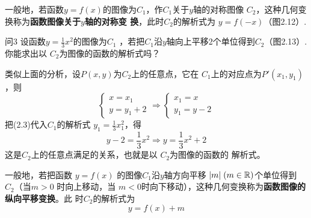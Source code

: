 一般地，若函数$y=f(x)$的图像为$C_1$，作$C_1$关于$y$轴的对称图像
$C_2$，这种几何变换称为\textbf{函数图像关于$y$轴的对称变
换}，此时$C_2$的解析式为
$y=f(-x)$（图2.12）.

\begin{thm}{问3}
设函数$y=\frac{1}{3}x^2$的图像为$C_1$
，若把$C_1$沿$y$轴向上平移2个单位得到$C_2$（图2.13）. 你能求出以
$C_2$为图像的函数的解析式吗？
\end{thm}

类似上面的分析，设$P(x,y)$为$C_2$上的任意点，它在
$C_1$上的对应点为$P'(x_1,y_1)$，则
\begin{equation}
    \begin{cases}
        x=x_1\\y=y_1+2
    \end{cases}\Longrightarrow \begin{cases}
        x_1=x\\y_1=y-2
    \end{cases}
\end{equation}
把(2.3)代入$C_1$的解析式
$y_1=\frac{1}{3}x_1^2$，得
\[y-2=\frac{1}{3}x^2\Longrightarrow y=\frac{1}{3}x^2+2\]
这是$C_2$上的任意点满足的关系，也就是以
$C_2$为图像的函数的
解析式。

一般地，若把函数
$y=f(x)$
的图像$C_1$沿$y$轴方向平移
$|m|\; (m\in\mathbb{R})$个单位得到
$C_2$（当$m>0$
时向上移动，当
$m<0$时向下移动），这种几何变换称为\textbf{函数图像的纵向平移变换}。此
时$C_2$的解析式为
\[y=f(x)+m\]

